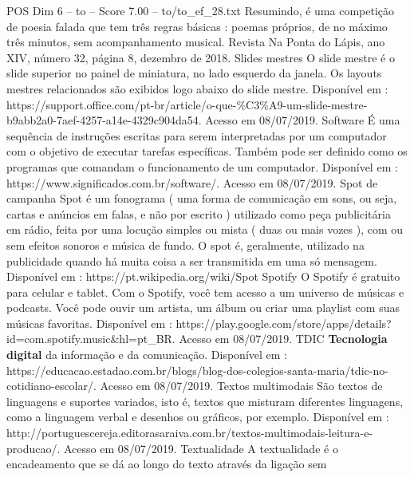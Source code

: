 \begin{textsample}{POS Dim 6 – to – Score 7.00 – to/to\_ef\_28.txt}
Resumindo, é uma competição de poesia falada que tem três regras básicas : poemas próprios, de no máximo três minutos, sem acompanhamento musical.
Revista Na Ponta do Lápis, ano XIV, número 32, página 8, dezembro de 2018.
Slides mestres O slide mestre é o slide superior no painel de miniatura, no lado esquerdo da janela.
Os layouts mestres relacionados são exibidos logo abaixo do slide mestre.
Disponível em : https://support.office.com/pt-br/article/o-que-\%C3\%A9-um-slide-mestre-b9abb2a0-7aef-4257-a14e-4329c904da54.
Acesso em 08/07/2019.
Software É uma sequência de instruções escritas para serem interpretadas por um computador com o objetivo de executar tarefas específicas.
Também pode ser definido como os programas que comandam o funcionamento de um computador.
Disponível em : https://www.significados.com.br/software/.
Acesso em 08/07/2019.
Spot de campanha Spot é um fonograma ( uma forma de comunicação em sons, ou seja, cartas e anúncios em falas, e não por escrito ) utilizado como peça publicitária em rádio, feita por uma locução simples ou mista ( duas ou mais vozes ), com ou sem efeitos sonoros e música de fundo.
O spot é, geralmente, utilizado na publicidade quando há muita coisa a ser transmitida em uma só mensagem.
Disponível em : https://pt.wikipedia.org/wiki/Spot Spotify O Spotify é gratuito para celular e tablet.
Com o Spotify, você tem acesso a um universo de músicas e podcasts.
Você pode ouvir um artista, um álbum ou criar uma playlist com suas músicas favoritas.
Disponível em : https://play.google.com/store/apps/details? id=com.spotify.music\&hl=pt\_BR.
Acesso em 08/07/2019.
TDIC \textbf{Tecnologia} \textbf{digital} da informação e da comunicação.
Disponível em : https://educacao.estadao.com.br/blogs/blog-dos-colegios-santa-maria/tdic-no-cotidiano-escolar/.
Acesso em 08/07/2019.
Textos multimodais São textos de linguagens e suportes variados, isto é, textos que misturam diferentes linguagens, como a linguagem verbal e desenhos ou gráficos, por exemplo.
Disponível em : http://portuguescereja.editorasaraiva.com.br/textos-multimodais-leitura-e-producao/.
Acesso em 08/07/2019.
Textualidade A textualidade é o encadeamento que se dá ao longo do texto através da ligação sem

\end{textsample}
